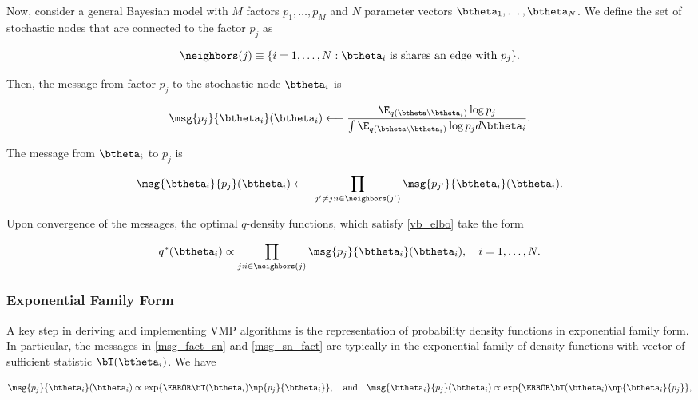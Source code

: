 \documentclass[12pt]{article}
\theoremstyle{plain}
\theoremstyle{definition}
\theoremstyle{remark}
\begin{document}
Now, consider a general Bayesian model with $M$ factors $p_1, \dots, p_M$ and $N$ parameter vectors
$\btheta_1, \dots, \btheta_N$. We define the set of stochastic nodes that are connected to the factor
$p_j$ as

\[
	\neighbors (j) \equiv \{ i = 1, \dots, N: \text{$\btheta_i$ is shares an edge with $p_j$} \}.
\]

\noindent Then, the message from factor
$p_j$ to the stochastic node $\btheta_i$ is

\begin{equation}
	\msg{p_j}{\btheta_i} (\btheta_i)
		\longleftarrow
			\frac{
				\E_{q(\btheta \setminus \btheta_i)} \log p_j
			} {
				\int \E_{q(\btheta \setminus \btheta_i)} \log p_j d\btheta_i
			}.
\label{msg_fact_sn}
\end{equation}

\noindent The message from $\btheta_i$ to $p_j$ is

\begin{equation}
	\msg{\btheta_i}{p_j} (\btheta_i)
		\longleftarrow
			\prod_{j' \neq j : i \in \neighbors(j')} \msg{p_{j'}}{\btheta_i} (\btheta_i).
\label{msg_sn_fact}
\end{equation}

\noindent Upon convergence of the messages, the optimal $q$-density functions, which satisfy \eqref{vb_elbo}
take the form

\begin{equation}
	q^* (\btheta_i) \propto \prod_{j : i \in \neighbors(j)} \msg{p_j}{\btheta_i} (\btheta_i), \quad i = 1, \dots, N.
\label{opt_q_vmp}
\end{equation}


\subsubsection{Exponential Family Form}
\label{sec:exp_fam_form}

A key step in deriving and implementing VMP algorithms is the representation of probability density functions
in exponential family form. In particular, the messages in \eqref{msg_fact_sn} and \eqref{msg_sn_fact}
are typically in the exponential family of density functions with vector of sufficient statistic $\bT (\btheta_i)$. We have

\[
	\msg{p_j}{\btheta_i} (\btheta_i)
		\propto
			\exp \{ \T{\bT (\btheta_i)} \np{p_j}{\btheta_i} \}, \quad
	\text{and} \quad
	\msg{\btheta_i}{p_j} (\btheta_i)
		\propto
			\exp \{ \T{\bT (\btheta_i)} \np{\btheta_i}{p_j} \},
\]
\end{document}
